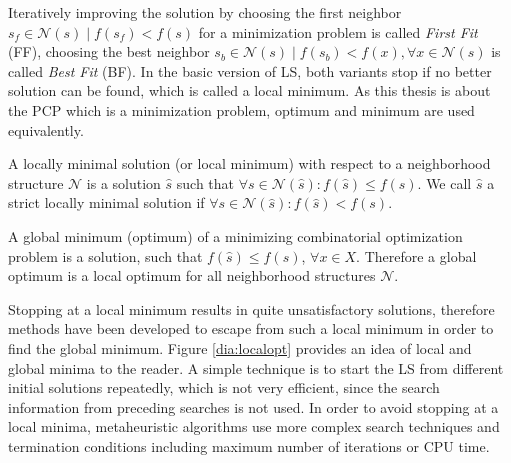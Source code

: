 Iteratively improving the solution by choosing the first neighbor $s_f \in \mathcal{N}(s) \mid f(s_f)<f(s)$ for a minimization problem is called \textit{First Fit} (FF), choosing the best neighbor $s_b \in \mathcal{N}(s) \mid f(s_b)<f(x), \forall x\in \mathcal{N}(s)$ is called \textit{Best Fit} (BF). In the basic version of LS, both variants stop if no better solution can be found, which is called a local minimum. As this thesis is about the PCP which is a minimization problem, optimum and minimum are used equivalently.

\begin{definition}
A locally minimal solution (or local minimum) with respect to a neighborhood structure $\mathcal{N}$ is a solution $\hat{s}$ such that $\forall s \in \mathcal{N}(\hat{s}):f(\hat{s})\leq f(s)$. We call $\hat{s}$ a strict locally minimal solution if $\forall s \in \mathcal{N}(\hat{s}) : f(\hat{s})<f(s)$.
\label{def:localminimum}
\end{definition}

\begin{definition}
A global minimum (optimum) of a minimizing combinatorial optimization problem is a solution, such that $f(\hat{s}) \leq f(s)$, $\forall x \in X$. Therefore a global optimum is a local optimum for all neighborhood structures $\mathcal{N}$.
\label{def:globalminimum}
\end{definition}

Stopping at a local minimum results in quite unsatisfactory solutions, therefore methods have been developed to escape from such a local minimum in order to find the global minimum. Figure \ref{dia:localopt} provides an idea of local and global minima to the reader. A simple technique is to start the LS from different initial solutions repeatedly, which is not very efficient, since the search information from preceding searches is not used. In order to avoid stopping at a local minima, metaheuristic algorithms use more complex search techniques and termination conditions including maximum number of iterations or CPU time.

